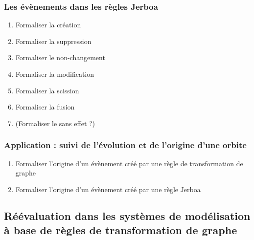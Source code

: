 \documentclass[11pt]{article}
\begin{document}
\subsubsection{Les évènements dans les règles Jerboa}
\label{sec:orgdff4c4e}
\begin{enumerate}
\item Formaliser la création
\label{sec:orge50a91d}
\item Formaliser la suppression
\label{sec:org8165c48}
\item Formaliser le non-changement
\label{sec:orgd8a60e9}
\item Formaliser la modification
\label{sec:orgdd49ef2}
\item Formaliser la scission
\label{sec:org6cc50a3}
\item Formaliser la fusion
\label{sec:orgbbdb643}
\item (Formaliser le sans effet ?)
\label{sec:org7c756cb}
\end{enumerate}
\subsubsection{Application : suivi de l'évolution et de l'origine d'une orbite}
\label{sec:org95820e9}
\begin{enumerate}
\item Formaliser l'origine d'un évènement créé par une règle de transformation de graphe
\label{sec:orgc3a6b82}
\item Formaliser l'origine d'un évènement créé par une règle Jerboa
\label{sec:orge387459}
\end{enumerate}
\subsection{Réévaluation dans les systèmes de modélisation à base de règles de transformation de graphe}
\label{sec:org7d14af0}
\end{document}
